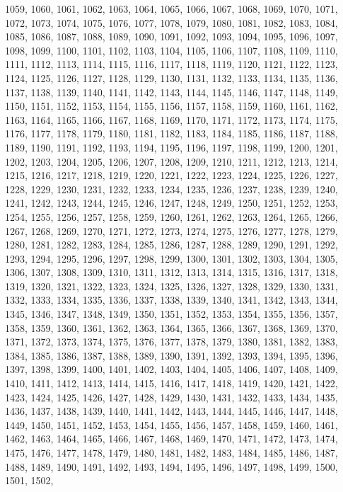 \documentclass[a4paper,11pt]{article}
\numberwithin{equation}{section}
\begin{document}
1059, 1060, 1061, 1062, 1063, 1064, 1065, 1066, 1067, 1068, 1069, 1070,
1071, 1072, 1073, 1074, 1075, 1076, 1077, 1078, 1079, 1080, 1081, 1082,
1083, 1084, 1085, 1086, 1087, 1088, 1089, 1090, 1091, 1092, 1093, 1094,
1095, 1096, 1097, 1098, 1099, 1100, 1101, 1102, 1103, 1104, 1105, 1106,
1107, 1108, 1109, 1110, 1111, 1112, 1113, 1114, 1115, 1116, 1117, 1118,
1119, 1120, 1121, 1122, 1123, 1124, 1125, 1126, 1127, 1128, 1129, 1130,
1131, 1132, 1133, 1134, 1135, 1136, 1137, 1138, 1139, 1140, 1141, 1142,
1143, 1144, 1145, 1146, 1147, 1148, 1149, 1150, 1151, 1152, 1153, 1154,
1155, 1156, 1157, 1158, 1159, 1160, 1161, 1162, 1163, 1164, 1165, 1166,
1167, 1168, 1169, 1170, 1171, 1172, 1173, 1174, 1175, 1176, 1177, 1178,
1179, 1180, 1181, 1182, 1183, 1184, 1185, 1186, 1187, 1188, 1189, 1190,
1191, 1192, 1193, 1194, 1195, 1196, 1197, 1198, 1199, 1200, 1201, 1202,
1203, 1204, 1205, 1206, 1207, 1208, 1209, 1210, 1211, 1212, 1213, 1214,
1215, 1216, 1217, 1218, 1219, 1220, 1221, 1222, 1223, 1224, 1225, 1226,
1227, 1228, 1229, 1230, 1231, 1232, 1233, 1234, 1235, 1236, 1237, 1238,
1239, 1240, 1241, 1242, 1243, 1244, 1245, 1246, 1247, 1248, 1249, 1250,
1251, 1252, 1253, 1254, 1255, 1256, 1257, 1258, 1259, 1260, 1261, 1262,
1263, 1264, 1265, 1266, 1267, 1268, 1269, 1270, 1271, 1272, 1273, 1274,
1275, 1276, 1277, 1278, 1279, 1280, 1281, 1282, 1283, 1284, 1285, 1286,
1287, 1288, 1289, 1290, 1291, 1292, 1293, 1294, 1295, 1296, 1297, 1298,
1299, 1300, 1301, 1302, 1303, 1304, 1305, 1306, 1307, 1308, 1309, 1310,
1311, 1312, 1313, 1314, 1315, 1316, 1317, 1318, 1319, 1320, 1321, 1322,
1323, 1324, 1325, 1326, 1327, 1328, 1329, 1330, 1331, 1332, 1333, 1334,
1335, 1336, 1337, 1338, 1339, 1340, 1341, 1342, 1343, 1344, 1345, 1346,
1347, 1348, 1349, 1350, 1351, 1352, 1353, 1354, 1355, 1356, 1357, 1358,
1359, 1360, 1361, 1362, 1363, 1364, 1365, 1366, 1367, 1368, 1369, 1370,
1371, 1372, 1373, 1374, 1375, 1376, 1377, 1378, 1379, 1380, 1381, 1382,
1383, 1384, 1385, 1386, 1387, 1388, 1389, 1390, 1391, 1392, 1393, 1394,
1395, 1396, 1397, 1398, 1399, 1400, 1401, 1402, 1403, 1404, 1405, 1406,
1407, 1408, 1409, 1410, 1411, 1412, 1413, 1414, 1415, 1416, 1417, 1418,
1419, 1420, 1421, 1422, 1423, 1424, 1425, 1426, 1427, 1428, 1429, 1430,
1431, 1432, 1433, 1434, 1435, 1436, 1437, 1438, 1439, 1440, 1441, 1442,
1443, 1444, 1445, 1446, 1447, 1448, 1449, 1450, 1451, 1452, 1453, 1454,
1455, 1456, 1457, 1458, 1459, 1460, 1461, 1462, 1463, 1464, 1465, 1466,
1467, 1468, 1469, 1470, 1471, 1472, 1473, 1474, 1475, 1476, 1477, 1478,
1479, 1480, 1481, 1482, 1483, 1484, 1485, 1486, 1487, 1488, 1489, 1490,
1491, 1492, 1493, 1494, 1495, 1496, 1497, 1498, 1499, 1500, 1501, 1502,
\end{document}
